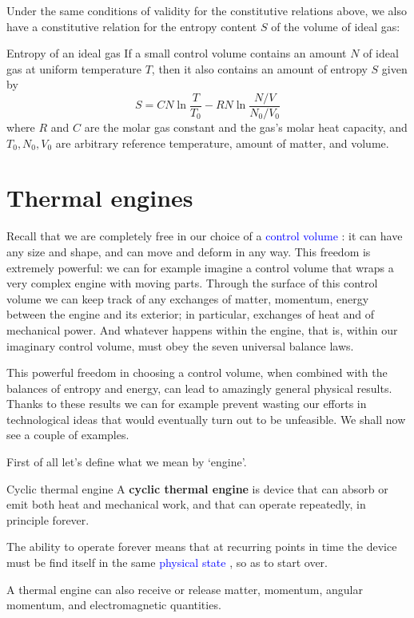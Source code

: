 \documentclass[a4paper,12pt,%
onecolumn,oneside,%
british%
]{memoir}
\renewcommand*{\|}[1][]{\nonscript\:#1\vert\nonscript\:\mathopen{}}
\newcommand*{\sect}{\S}%
\renewcommand*{\autoref}[3][\sect\,\ref]{\textcolor{blue}{#3}
\raisebox{0.6ex}{\color{blue}\miniscule%
\faIcon{angle-right}%
\;#1{#2}\;p.\,\pageref{#2}}}
\newcommand*{\yN}{N}
\newcommand*{\yS}{S}
\newcommand*{\yT}{T}%
\begin{document}
Under the same conditions of validity for the constitutive relations above, we also have a constitutive relation for the entropy content $\yS$ of the volume of ideal gas:
\begin{definition}{Entropy of an ideal gas}
  If a small control volume contains an amount $\yN$ of ideal gas at uniform temperature $\yT$, then it also contains an amount of entropy $\yS$ given by
  \begin{equation}
    \label{eq:entropy_idealgas}
    \yS = C \yN \ln\frac{\yT}{\yT_{0}} - R \yN \ln\frac{\yN/V}{\yN_{0}/V_{0}}
  \end{equation}
  where $R$ and $C$ are the molar gas constant and the gas's molar heat capacity, and $\yT_{0}, \yN_{0}, V_{0}$ are arbitrary reference temperature, amount of matter, and volume.
\end{definition}


\section{Thermal engines}
\label{sec:heat_engine}

Recall that we are completely free in our choice of a \autoref{sec_controlvolumes_surfaces}{control volume}: it can have any size and shape, and can move and deform in any way. This freedom is extremely powerful: we can for example imagine a control volume that wraps a very complex engine with moving parts. Through the surface of this control volume we can keep track of any exchanges of matter, momentum, energy between the engine and its exterior; in particular, exchanges of heat and of mechanical power. And whatever happens within the engine, that is, within our imaginary control volume, must obey the seven universal balance laws.

This powerful freedom in choosing a control volume, when combined with the balances of entropy and energy, can lead to amazingly general physical results. Thanks to these results we can for example prevent wasting our efforts in technological ideas that would eventually turn out to be unfeasible. We shall now see a couple of examples.

\medskip

First of all let's define what we mean by \enquote*{engine}.

\begin{definition}{Cyclic thermal engine}\label{def:thermal_engine}
  A \textbf{cyclic thermal engine} is device that can absorb or emit both heat and mechanical work, and that can operate repeatedly, in principle forever.

  \smallskip

  The ability to operate forever means that at recurring points in time the device must be find itself in the same \autoref{def:state}{physical state}, so as to start over.

  \smallskip

  A thermal engine can also receive or release matter, momentum, angular momentum, and electromagnetic quantities.
\end{definition}
\end{document}
